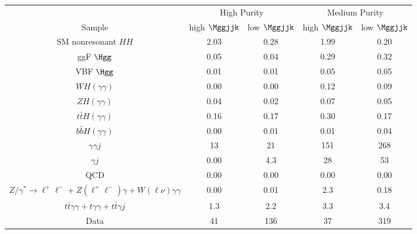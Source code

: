 \begin{tabular}{|c|c|c|c|c|}
\hline
 & \multicolumn{2}{c|}{High Purity} & \multicolumn{2}{c|}{Medium Purity} \\
Sample & high $\Mggjjk$ & low $\Mggjjk$ & high $\Mggjjk$ & low $\Mggjjk$ \\
\hline
SM nonresonant $HH$ & 2.03 & 0.28 & 1.99 & 0.20\\
\hline
ggF $\Hgg$                &  0.05 & 0.04 & 0.29 & 0.32\\
VBF $\Hgg$                &  0.01 & 0.01 & 0.05 & 0.05\\
$WH(\gamma\gamma)$        &  0.00 & 0.00 & 0.12 & 0.09\\     
$ZH(\gamma\gamma)$        &  0.04 & 0.02 & 0.07 & 0.05\\
$t\bar{t}H(\gamma\gamma)$ &  0.16 & 0.17 & 0.30 & 0.17\\
$b\bar{b}H(\gamma\gamma)$ &  0.00 & 0.01 & 0.01 & 0.04\\  
\hline
$\gamma\gamma j$     &  13 & 21  & 151 & 268 \\
$\gamma j$           & 0.00& 4.3 & 28  & 53  \\
QCD                  & 0.00& 0.00& 0.00& 0.00\\
$Z/\gamma^*\rightarrow\ell^+\ell^- + Z(\ell^+\ell^-)\gamma + W(\ell\nu)\gamma\gamma$
   & 0.00 & 0.01 & 2.3 & 0.18 \\
$t\bar{t}\gamma\gamma + t\gamma\gamma + t\bar{t}\gamma j$ &  1.3 & 2.2 & 3.3 & 3.4 \\
\hline
Data                                  & 41 & 136 & 37 & 319 \\
\hline
\end{tabular}
